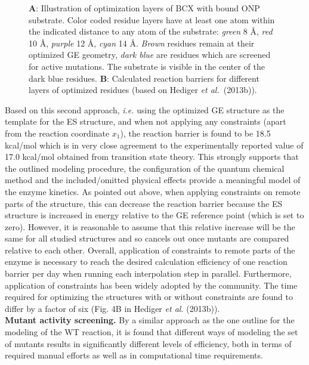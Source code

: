 \begin{figure}[htbp]
\begin{minipage}{0.51\linewidth}
\end{minipage}
\caption{
\textbf{A}: Illustration of optimization layers of BCX with bound ONP substrate.
Color coded residue layers have at least one atom within the indicated distance to any atom of the substrate:
\textit{green} 8 \AA, \textit{red} 10 \AA, \textit{purple} 12 \AA, \textit{cyan} 14 \AA.
\textit{Brown} residues remain at their optimized GE geometry, \textit{dark blue} are residues which are screened for active mutations.
The substrate is visible in the center of the dark blue residues.
\textbf{B}: Calculated reaction barriers for different layers of optimized residues (based on Hediger \textit{et al.} (2013b)).
}
\label{fig:bcx_constr_constraint_layers}
\end{figure}
Based on this second approach, \textit{i.e.} using the optimized GE structure as the template for the ES structure, and when not applying any constraints (apart from the reaction coordinate $x_1$), the reaction barrier is found to be 18.5 kcal/mol which is in very close agreement to the experimentally reported value of 17.0 kcal/mol obtained from transition state theory\cite{joshi2000hydrogen}.
This strongly supports that the outlined modeling procedure, the configuration of the quantum chemical method and the included/omitted physical effects provide a meaningful model of the enzyme kinetics.
As pointed out above, when applying constraints on remote parts of the structure, this can decrease the reaction barrier because the ES structure is increased in energy relative to the GE reference point (which is set to zero).
However, it is reasonable to assume that this relative increase will be the same for all studied structures and so cancels out once mutants are compared relative to each other.  
Overall, application of constraints to remote parts of the enzyme is necessary to reach the desired calculation efficiency of one reaction barrier per day when running each interpolation step in parallel.
Furthermore, application of constraints has been widely adopted by the community\cite{himo2006quantum,siegbahn2009recent,liao2012comparison,lonsdale2013quantum}.
The time required for optimizing the structures with or without constraints are found to differ by a factor of six (Fig. 4B in Hediger \textit{et al.} (2013b)).\\
\textbf{Mutant activity screening.}
By a similar approach as the one outline for the modeling of the WT reaction, it is found that different ways of modeling the set of mutants results in significantly different levels of efficiency, both in terms of required manual efforts as well as in computational time requirements.
